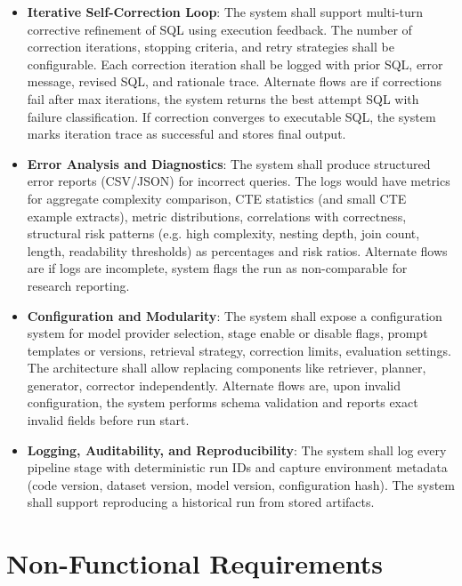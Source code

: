\begin{itemize}
    \item \textbf{Iterative Self-Correction Loop}: The system shall support multi-turn corrective refinement of SQL using execution feedback. The number of correction iterations, stopping criteria, and retry strategies shall be configurable. Each correction iteration shall be logged with prior SQL, error message, revised SQL, and rationale trace. Alternate flows are if corrections fail after max iterations, the system returns the best attempt SQL with failure classification. If correction converges to executable SQL, the system marks iteration trace as successful and stores final output.
    \item \textbf{Error Analysis and Diagnostics}: The system shall produce structured error reports (CSV/JSON) for incorrect queries. The logs would have metrics for aggregate complexity comparison, CTE statistics (and small CTE example extracts), metric distributions, correlations with correctness, structural risk patterns (e.g. high complexity, nesting depth, join count, length, readability thresholds) as percentages and risk ratios. Alternate flows are if logs are incomplete, system flags the run as non-comparable for research reporting.
    \item \textbf{Configuration and Modularity}: The system shall expose a configuration system for model provider selection, stage enable or disable flags, prompt templates or versions, retrieval strategy, correction limits, evaluation settings. The architecture shall allow replacing components like retriever, planner, generator, corrector independently. Alternate flows are, upon invalid configuration, the system performs schema validation and reports exact invalid fields before run start.
    \item \textbf{Logging, Auditability, and Reproducibility}: The system shall log every pipeline stage with deterministic run IDs and capture environment metadata (code version, dataset version, model version, configuration hash). The system shall support reproducing a historical run from stored artifacts.
\end{itemize}

\section{Non-Functional Requirements} \label{sec:nfr}

